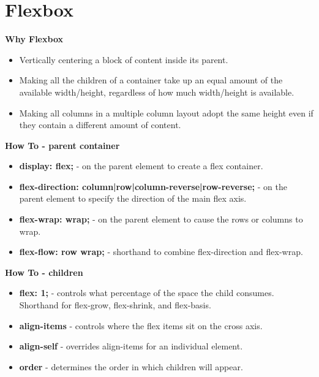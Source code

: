 \section{Flexbox}

\textbf{Why Flexbox}
\begin{itemize}
\item Vertically centering a block of content inside its parent.
\item Making all the children of a container take up an equal amount of the available width/height, regardless of how much width/height is available.
\item Making all columns in a multiple column layout adopt the same height even if they contain a different amount of content.
\end{itemize}
\textbf{How To - parent container}
\begin{itemize}
\item \textbf{display: flex;} - on the parent element to create a flex container.
\item \textbf{flex-direction: column|row|column-reverse|row-reverse;} - on the parent element to specify the direction of the main flex axis.
\item \textbf{flex-wrap: wrap;} - on the parent element to cause the rows or columns to wrap.
\item \textbf{flex-flow: row wrap;} - shorthand to combine flex-direction and flex-wrap.
\end{itemize}
\textbf{How To - children}
\begin{itemize}
\item \textbf{flex: 1;} - controls what percentage of the space the child consumes. Shorthand for  flex-grow,  flex-shrink, and flex-basis.
\item \textbf{align-items} - controls where the flex items sit on the cross axis.
\item \textbf{align-self} - overrides align-items for an individual element.
\item \textbf{order} - determines the order in which children will appear.
\end{itemize}
\onecolumn